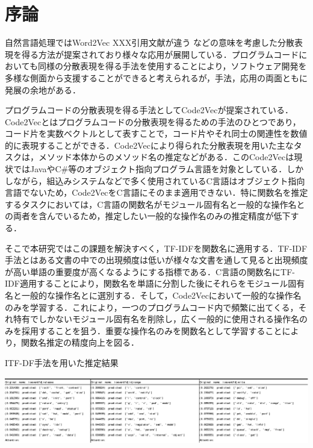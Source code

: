 \documentclass[submit,techrep,noauthor]{ipsj}
\begin{document}
\maketitle

\section{序論}
自然言語処理ではWord2Vec XXX引用文献が違う \cite{alon2019code2vec}などの意味を考慮した分散表現を得る方法が提案されており様々な応用が展開している．プログラムコードにおいても同様の分散表現を得る手法を使用することにより，ソフトウェア開発を多様な側面から支援することができると考えられるが，手法，応用の両面ともに発展の余地がある．

プログラムコードの分散表現を得る手法としてCode2Vec\cite{alon2019code2vec}が提案されている．Code2Vecとはプログラムコードの分散表現を得るための手法のひとつであり，コード片を実数ベクトルとして表すことで，コード片やそれ同士の関連性を数値的に表現することができる．Code2Vecにより得られた分散表現を用いた主なタスクは，メソッド本体からのメソッド名の推定などがある．このCode2Vecは現状ではJavaやC#等のオブジェクト指向プログラム言語を対象としている．しかしながら，組込みシステムなどで多く使用されているC言語はオブジェクト指向言語でないため，Code2VecをC言語にそのまま適用できない．特に関数名を推定するタスクにおいては，C言語の関数名がモジュール固有名と一般的な操作名との両者を含んでいるため，推定したい一般的な操作名のみの推定精度が低下する．

そこで本研究ではこの課題を解決すべく，TF-IDFを関数名に適用する．TF-IDF手法とはある文書の中での出現頻度は低いが様々な文書を通して見ると出現頻度が高い単語の重要度が高くなるようにする指標である．C言語の関数名にTF-IDF適用することにより，関数名を単語に分割した後にそれらをモジュール固有名と一般的な操作名とに選別する．そして，Code2Vecにおいて一般的な操作名のみを学習する．これにより，一つのプログラムコード内で頻繁に出てくる，それ特有でしかないモジュール固有名を削除し，広く一般的に使用される操作名のみを採用することを狙う．重要な操作名のみを関数名として学習することにより，関数名推定の精度向上を図る．

\begin{table}[t]
 \centering
 \caption{ITF-DF手法を用いた推定結果}
 \includegraphics[width=1.0\hsize]{image/result.eps} 
 \label{table1} 
\end{table}
\end{document}
